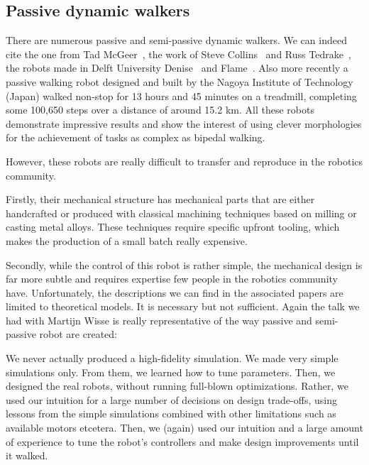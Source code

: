 

\subsection{Passive dynamic walkers} %

There are numerous passive and semi-passive dynamic walkers. We can indeed cite the one from Tad McGeer~\parencite{mcgeer1990passive}, the work of Steve Collins~\parencite{collins2001three} and Russ Tedrake~\parencite{tedrake2005learning}, the robots made in Delft University Denise~\parencite{wisse2005three} and Flame~\parencite{Hobbelen2008}. Also more recently a passive walking robot designed and built by the Nagoya Institute of Technology (Japan) walked non-stop for 13 hours and 45 minutes on a treadmill, completing some 100,650 steps over a distance of around 15.2 km. All these robots demonstrate impressive results and show the interest of using clever morphologies for the achievement of tasks as complex as bipedal walking.

However, these robots are really difficult to transfer and reproduce in the robotics community.

Firstly, their mechanical structure has mechanical parts that are either handcrafted or produced with classical machining techniques based on milling or casting metal alloys. These techniques require specific upfront tooling, which makes the production of a small batch really expensive.

Secondly, while the control of this robot is rather simple, the mechanical design is far more subtle and requires expertise few people in the robotics community have. Unfortunately, the descriptions we can find in the associated papers are limited to theoretical models. It is necessary but not sufficient. Again the talk we had with Martijn Wisse is really representative of the way passive and semi-passive robot are created:

\begin{formal}
We never actually produced a high-fidelity simulation. We made very simple simulations only. From them, we learned how to tune parameters. Then, we designed the real robots, without running full-blown optimizations. Rather, we used our intuition for a large number of decisions on design trade-offs, using lessons from the simple simulations combined with other limitations such as available motors etcetera. Then, we (again) used our intuition and a large amount of experience to tune the robot’s controllers and make design improvements until it walked.

\end{formal}

